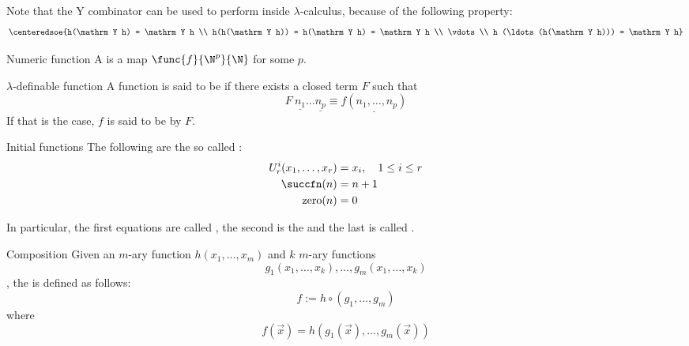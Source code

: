 \documentclass[a4paper, 12pt]{report}
\begin{document}
    Note that the $\mathrm Y$ combinator can be used to perform  inside $\lambda$-calculus, because of the following property: $$\centeredsoe{h(\mathrm Y h) = \mathrm Y h \\ h(h(\mathrm Y h)) = h(\mathrm Y h) = \mathrm Y h \\ \vdots \\ h (\ldots (h(\mathrm Y h))) = \mathrm Y h}$$ 


    \begin{frameddefn}{Numeric function}
        A  is a map $\func{f}{\N^p}{\N}$ for some $p$.
    \end{frameddefn}

    \begin{frameddefn}{$\lambda$-definable function}
        A function is said to be  if there exists a closed term $F$ such that $$F \ \underline{n_1} \ldots \underline{n_p} \equiv \underline{f(n_1, \ldots, n_p)}$$ If that is the case, $f$ is said to be  by $F$.
    \end{frameddefn}

    \begin{frameddefn}{Initial functions}
        The following are the so called :
        \begin{equation*}
            \begin{split}
                U_r^i(x_1, \ldots, x_r) &= x_i, \quad 1 \le i \le r \\
                \succfn(n) &= n + 1 \\
                \mathrm{zero}(n) &= 0
            \end{split}
        \end{equation*}
    \end{frameddefn}

    In particular, the first equations are called , the second is the  and the last is called .

    \begin{frameddefn}{Composition}
        Given an $m$-ary function $h(x_1, \ldots, x_m)$ and $k$ $m$-ary functions $$g_1(x_1, \ldots, x_k), \ldots, g_m(x_1, \ldots, x_k)$$, the  is defined as follows: $$f := h \circ (g_1, \ldots, g_m)$$ where $$f(\vec x) = h(g_1(\vec x), \ldots, g_m(\vec x))$$
    \end{frameddefn}
\end{document}

